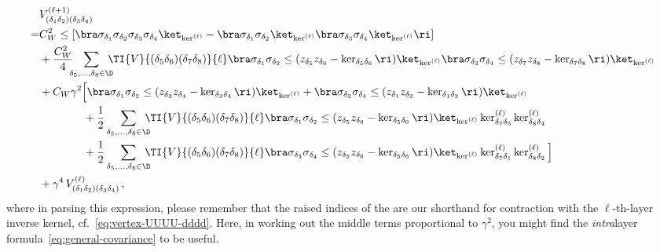 \begin{align}\label{eq:V-recursion-tree-Res}
&V^{(\ell+1)}_{(\delta_1\delta_2)(\delta_3\delta_4)}\, \\
=&C_W^2\le[\bra\sigma_{\delta_1} \sigma_{\delta_2} \sigma_{\delta_3} \sigma_{\delta_4}\ket_{\ker^{(\ell)}}  - \bra \sigma_{\delta_1} \sigma_{\delta_2}\ket_{\ker^{(\ell)}} \bra \sigma_{\delta_3} \sigma_{\delta_4}\ket_{\ker^{(\ell)}} \ri]\, \notag\\
&+\frac{C_W^2}{4}\!\!\!\sum_{\delta_5,\ldots,\delta_8\in\D}\!\!\!\!\TI{V}{(\delta_5\delta_6)(\delta_7\delta_8)}{\ell}\bra\sigma_{\delta_1}\sigma_{\delta_2} \le(z_{\delta_5} z_{\delta_6}-\ker_{\delta_5\delta_6}\ri)\ket_{\ker^{(\ell)}}\bra \sigma_{\delta_3}\sigma_{\delta_4} \le(z_{\delta_7} z_{\delta_8}-\ker_{\delta_7\delta_8}\ri)\ket_{\ker^{(\ell)}}\,  \notag\\
&+C_W\gamma^2  \Big[\bra\sigma_{\delta_1}\sigma_{\delta_2} \le(z_{\delta_3} z_{\delta_4}-\ker_{\delta_3\delta_4}\ri)\ket_{\ker^{(\ell)}}+\bra\sigma_{\delta_3}\sigma_{\delta_4} \le(z_{\delta_1} z_{\delta_2}-\ker_{\delta_1\delta_2}\ri)\ket_{\ker^{(\ell)}}\, \notag\\
&\quad\quad\quad\quad+\frac{1}{2}\sum_{\delta_5,\ldots,\delta_8\in\D}\!\!\!\!\TI{V}{(\delta_5\delta_6)(\delta_7\delta_8)}{\ell}\bra\sigma_{\delta_1}\sigma_{\delta_2} \le(z_{\delta_5} z_{\delta_6}-\ker_{\delta_5\delta_6}\ri)\ket_{\ker^{(\ell)}}\ker_{\delta_7\delta_3}^{(\ell)}\ker_{\delta_8\delta_4}^{(\ell)}\notag\\
&\quad\quad\quad\quad+\frac{1}{2}\sum_{\delta_5,\ldots,\delta_8\in\D}\!\!\!\!\TI{V}{(\delta_5\delta_6)(\delta_7\delta_8)}{\ell}\bra\sigma_{\delta_3}\sigma_{\delta_4} \le(z_{\delta_5} z_{\delta_6}-\ker_{\delta_5\delta_6}\ri)\ket_{\ker^{(\ell)}}\ker_{\delta_7\delta_1}^{(\ell)}\ker_{\delta_8\delta_2}^{(\ell)}\Big]\notag\\
&+\gamma^4 \,V^{(\ell)}_{(\delta_1\delta_2)(\delta_3\delta_4)}\, ,
\end{align}
where in parsing this expression, please remember that the raised indices of the  are our shorthand for contraction with the $\ell$-th-layer inverse kernel, cf.~\eqref{eq:vertex-UUUU-dddd}.
Here, in working out the middle terms proportional to $\gamma^2$, you might find the \emph{intra}layer formula~\eqref{eq:general-covariance} to be useful.



